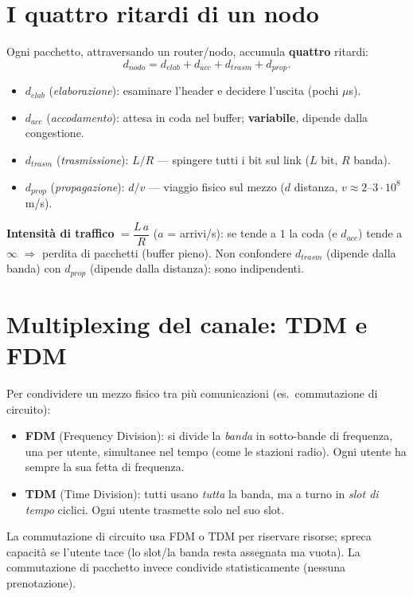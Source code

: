 \documentclass[11pt,a4paper]{report}
\begin{document}
\section{I quattro ritardi di un nodo}
\label{th:ritardi}
Ogni pacchetto, attraversando un router/nodo, accumula \textbf{quattro} ritardi:
\[ d_{nodo}=d_{elab}+d_{acc}+d_{trasm}+d_{prop}. \]
\begin{itemize}[noitemsep]
\item $d_{elab}$ (\emph{elaborazione}): esaminare l'header e decidere l'uscita (pochi $\mu$s).
\item $d_{acc}$ (\emph{accodamento}): attesa in coda nel buffer; \textbf{variabile}, dipende dalla congestione.
\item $d_{trasm}$ (\emph{trasmissione}): $L/R$ — spingere tutti i bit sul link ($L$ bit, $R$ banda).
\item $d_{prop}$ (\emph{propagazione}): $d/v$ — viaggio fisico sul mezzo ($d$ distanza, $v\approx 2$--$3\cdot10^8$ m/s).
\end{itemize}
\textbf{Intensità di traffico} $=\dfrac{L\,a}{R}$ ($a$ = arrivi/s): se tende a $1$
la coda (e $d_{acc}$) tende a $\infty$ $\Rightarrow$ perdita di pacchetti
(buffer pieno). Non confondere $d_{trasm}$ (dipende dalla banda) con $d_{prop}$
(dipende dalla distanza): sono indipendenti.

\section{Multiplexing del canale: TDM e FDM}
Per condividere un mezzo fisico tra più comunicazioni (es.\ commutazione di
circuito):
\begin{itemize}[noitemsep]
\item \textbf{FDM} (Frequency Division): si divide la \emph{banda} in
sotto-bande di frequenza, una per utente, simultanee nel tempo (come le stazioni
radio). Ogni utente ha sempre la sua fetta di frequenza.
\item \textbf{TDM} (Time Division): tutti usano \emph{tutta} la banda, ma a turno
in \emph{slot di tempo} ciclici. Ogni utente trasmette solo nel suo slot.
\end{itemize}
La commutazione di circuito usa FDM o TDM per riservare risorse; spreca capacità
se l'utente tace (lo slot/la banda resta assegnata ma vuota). La commutazione di
pacchetto invece condivide statisticamente (nessuna prenotazione).
\end{document}
